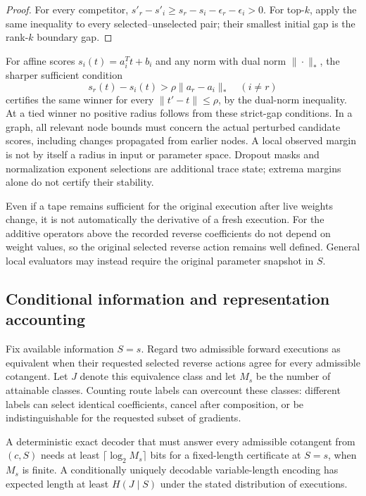 \begin{proof}
For every competitor,
$s'_r-s'_i\geq s_r-s_i-\epsilon_r-\epsilon_i>0$.
For top-$k$, apply the same inequality to every selected--unselected pair;
their smallest initial gap is the rank-$k$ boundary gap.
\end{proof}

For affine scores $s_i(t)=a_i^Tt+b_i$ and any norm with dual norm
$\|\cdot\|_*$, the sharper sufficient condition
\begin{equation}
 s_r(t)-s_i(t)>\rho\|a_r-a_i\|_*
 \quad (i\ne r)
\end{equation}
certifies the same winner for every $\|t'-t\|\leq\rho$, by the dual-norm
inequality. At a tied winner no positive radius follows from these strict-gap
conditions. In a graph, all relevant node bounds must concern the actual
perturbed candidate scores, including changes propagated from earlier nodes.
A local observed margin is not by itself a radius in input or parameter
space. Dropout masks and normalization exponent selections are additional
trace state; extrema margins alone do not certify their stability.

Even if a tape remains sufficient for the original execution after live
weights change, it is not automatically the derivative of a fresh execution.
For the additive operators above the recorded reverse coefficients do not
depend on weight values, so the original selected reverse action remains
well defined. General local evaluators may instead require the original
parameter snapshot in $S$.

\subsection{Conditional information and representation accounting}
\label{app:information}

Fix available information $S=s$. Regard two admissible forward executions as
equivalent when their requested selected reverse actions agree for every
admissible cotangent. Let $J$ denote this equivalence class and let $M_s$ be
the number of attainable classes. Counting route labels can overcount these
classes: different labels can select identical coefficients, cancel after
composition, or be indistinguishable for the requested subset of gradients.

\begin{proposition}
\label{prop:action-coding}
A deterministic exact decoder that must answer every admissible cotangent
from $(c,S)$ needs at least $\lceil\log_2 M_s\rceil$ bits for a fixed-length
certificate at $S=s$, when $M_s$ is finite. A conditionally uniquely decodable
variable-length encoding has expected length at least $H(J\mid S)$ under
the stated distribution of executions.
\end{proposition}

